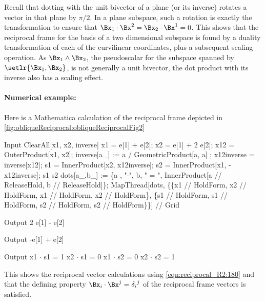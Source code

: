 Recall that dotting with the unit bivector of a plane (or its inverse) rotates a vector in that plane by \( \pi/2 \).
In a plane subspace, such a rotation is exactly the transformation to ensure that \( \Bx_1 \cdot \Bx^2 = \Bx_2 \cdot \Bx^1 = 0 \).
This shows that the reciprocal frame for the basis of a two dimensional subspace is found by a duality transformation of each of the curvilinear coordinates, plus a subsequent scaling operation.
As \( \Bx_1 \wedge \Bx_2 \), the pseudoscalar for the subspace spanned by \( \setlr{ \Bx_1, \Bx_2 } \), is not generally a unit bivector, the dot product with its inverse also has a scaling effect.

\paragraph{Numerical example:}
Here is a Mathematica calculation of the reciprocal frame depicted in \cref{fig:obliqueReciprocal:obliqueReciprocalFig2}

\begin{mmaCell}[moredefined={x1, x2, inverse, e, x12, OuterProduct, GeometricProduct, x12inverse, s1, InnerProduct, s2, dots},morepattern={a_, a, b_, b}]{Input}
  ClearAll[x1, x2, inverse]
  x1 = e[1] + e[2]; x2 = e[1] + 2 e[2];
  x12 = OuterProduct[x1, x2];
  inverse[a_] := a / GeometricProduct[a, a] ;
  x12inverse = inverse[x12];
  s1 = InnerProduct[x2, x12inverse];
  s2 = InnerProduct[x1, -x12inverse];
  s1
  s2
  dots[a_,b_] := \{a , "\(\pmb{\cdot}\)", b, " = ",
                   InnerProduct[a // ReleaseHold, b // ReleaseHold]\};
  MapThread[dots, \{\{x1 // HoldForm, x2 // HoldForm,
                      x1 // HoldForm, x2 // HoldForm\},
                  \{s1 // HoldForm, s1 // HoldForm,
                    s2 // HoldForm, s2 // HoldForm\}\}] // Grid
\end{mmaCell}
\begin{mmaCell}{Output}
  2 e[1] - e[2]
\end{mmaCell}
\begin{mmaCell}{Output}
  -e[1] + e[2]
\end{mmaCell}
\begin{mmaCell}{Output}
  x1	\(\cdot\)	s1	 = 	1
  x2	\(\cdot\)	s1	 = 	0
  x1	\(\cdot\)	s2	 = 	0
  x2	\(\cdot\)	s2	 = 	1
\end{mmaCell}

This shows the reciprocal vector calculations using \cref{eqn:reciprocal_R2:180} and that the
defining property
\( \Bx_i \cdot \Bx^j = {\delta_i}^j \)
of the reciprocal frame vectors
is satisfied.

